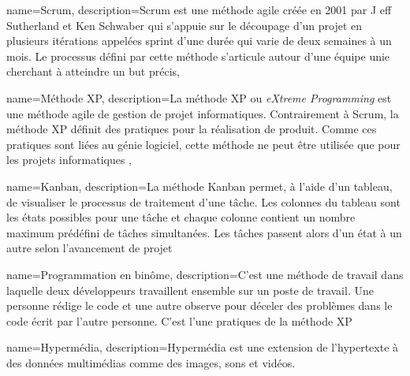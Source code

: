 \documentclass[a4paper,12pt,dvipsnames]{report}
\begin{document}
 

     
     

    \tableofcontents 
    \listoffigures 
    \listoftables

    
    
     
     
     
    

    
    



     { 
        name={Scrum}, 
        description={Scrum est une méthode agile créée en 2001 par J
            eff Sutherland et Ken Schwaber qui s'appuie sur le découpage d'un 
            projet en plusieurs itérations appelées sprint d'une durée qui 
            varie de deux semaines à un mois. Le processus défini par cette 
            méthode s'articule autour d'une équipe unie cherchant à atteindre 
            un but précis}, 
        }

 { 
    name={M\'ethode XP}, 
    description={La méthode XP ou \textit{eXtreme Programming} est une méthode 
        agile de gestion de projet informatiques. Contrairement à Scrum, la 
        méthode XP définit des pratiques pour la réalisation de produit. Comme 
        ces pratiques sont liées au génie logiciel, cette méthode ne peut être 
        utilisée que pour les projets informatiques },
    }

 { 
    name={Kanban}, 
    description={La méthode Kanban permet, à l'aide d'un tableau, de visualiser 
        le processus de traitement d'une tâche. Les colonnes du tableau sont les 
        états possibles pour une tâche et chaque colonne contient un nombre 
        maximum prédéfini de tâches simultanées. Les tâches passent alors d'un 
        état à un autre selon l'avancement de projet}
    }

 { 
    name={Programmation en binôme},
    description={C'est une méthode de travail dans laquelle deux développeurs
        travaillent ensemble sur un poste de travail. Une personne rédige le 
        code et une autre observe pour déceler des problèmes dans le code écrit 
        par l'autre personne. C'est l'une pratiques de la méthode XP}
    }

 { 
    name={Hyperm\'edia}, 
    description={Hypermédia est une extension de l'hypertexte à des données 
        multimédias comme des images, sons et vidéos.}
    }
\end{document}
